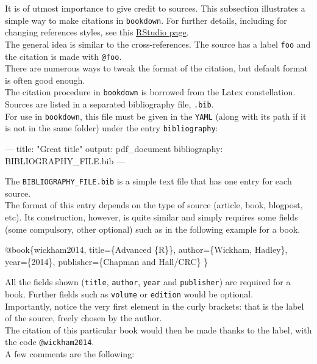 \documentclass[]{book}
\newenvironment{Shaded}{}{}
\newcommand{\AttributeTok}[1]{\textcolor[rgb]{0.49,0.56,0.16}{#1}}
\newcommand{\FunctionTok}[1]{\textcolor[rgb]{0.02,0.16,0.49}{#1}}
\newcommand{\NormalTok}[1]{#1}
\newcommand{\OtherTok}[1]{\textcolor[rgb]{0.00,0.44,0.13}{#1}}
\newcommand{\StringTok}[1]{\textcolor[rgb]{0.25,0.44,0.63}{#1}}
\theoremstyle{definition}
\theoremstyle{definition}
\theoremstyle{definition}
\theoremstyle{remark}
\begin{document}
It is of utmost importance to give credit to sources. This subsection
illustrates a simple way to make citations in \texttt{bookdown}. For
further details, including for changing references styles, see this
\href{https://rmarkdown.rstudio.com/authoring_bibliographies_and_citations.html}{RStudio
page}.\\
The general idea is similar to the cross-references. The source has a
label \texttt{foo} and the citation is made with \texttt{@foo}.\\
There are numerous ways to tweak the format of the citation, but default
format is often good enough.\\
The citation procedure in \texttt{bookdown} is borrowed from the Latex
constellation.\\
Sources are listed in a separated bibliography file, \texttt{.bib}.\\
For use in \texttt{bookdown}, this file must be given in the
\texttt{YAML} (along with its path if it is not in the same folder)
under the entry \texttt{bibliography}:

\begin{Shaded}
\begin{Highlighting}[]
\OtherTok{---}
\FunctionTok{title:}\AttributeTok{ }\StringTok{"Great title"}
\FunctionTok{output:}\AttributeTok{ pdf_document}
\FunctionTok{bibliography:}\AttributeTok{ BIBLIOGRAPHY_FILE.bib}
\OtherTok{---}
\end{Highlighting}
\end{Shaded}

The \texttt{BIBLIOGRAPHY\_FILE.bib} is a simple text file that has one
entry for each source.\\
The format of this entry depends on the type of source (article, book,
blogpost, etc). Its construction, however, is quite similar and simply
requires some fields (some compulsory, other optional) such as in the
following example for a book.

\begin{Shaded}
\begin{Highlighting}[]
\NormalTok{@book\{wickham2014,}
\NormalTok{  title=\{Advanced \{R\}\},}
\NormalTok{  author=\{Wickham, Hadley\},}
\NormalTok{  year=\{2014\},}
\NormalTok{  publisher=\{Chapman and Hall/CRC\}}
\NormalTok{\}}
\end{Highlighting}
\end{Shaded}

All the fields shown (\texttt{title}, \texttt{author}, \texttt{year} and
\texttt{publisher}) are required for a book. Further fields such as
\texttt{volume} or \texttt{edition} would be optional.\\
Importantly, notice the very first element in the curly brackets: that
is the label of the source, freely chosen by the author.\\
The citation of this particular book would then be made thanks to the
label, with the code \texttt{@wickham2014}.\\
A few comments are the following:
\end{document}
